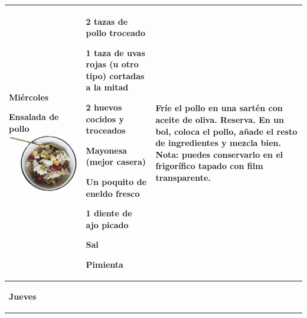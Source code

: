 \documentclass[menu.tex]{subfiles}
\begin{document}
\begin{tabular} {p{3.5cm} p{4cm} p{9cm}}
    \pbox{20cm}
    {
        \rule{0pt}{3ex}\begin{large}\textbf{Miércoles}\end{large}\\ 
        \rule{0pt}{2ex}Ensalada de pollo\\
        \includegraphics[scale=0.4]{ensalada-de-pollo} 
    } & 
    \vspace{-2cm}            
    \begin{compactitem} 
        \begin{scriptsize}
            \item 2 tazas de pollo troceado
            \item 1 taza de uvas rojas (u otro tipo) cortadas a la mitad
            \item 2 huevos cocidos y troceados
            \item Mayonesa (mejor casera)
            \item Un poquito de eneldo fresco
            \item 1 diente de ajo picado
            \item Sal
            \item Pimienta
        \end{scriptsize}
    \end{compactitem}&
    \vspace{-2cm}        
    Fríe el pollo en una sartén con aceite de oliva. Reserva.
    En un bol, coloca el pollo, añade el resto de ingredientes y mezcla bien.
    Nota: puedes conservarlo en el frigorífico tapado con film transparente.\\
    \hline
    \pbox{20cm}
    {
        \rule{0pt}{3ex}\begin{large}\textbf{Jueves}\end{large}\\ 
}
\end{tabular}
\end{document}
